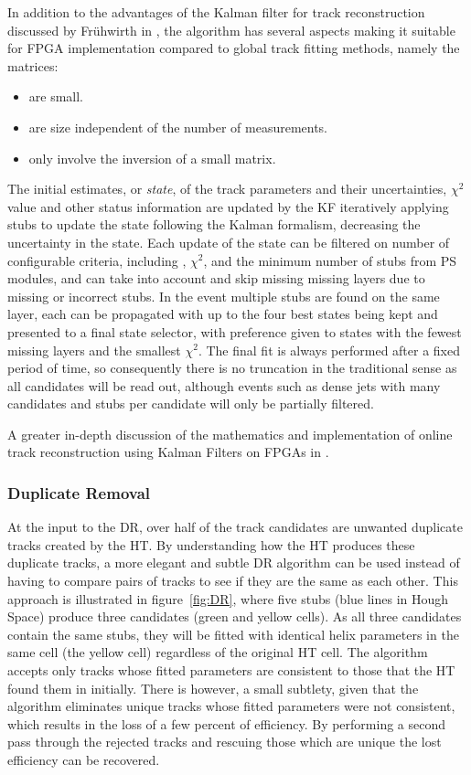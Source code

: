 In addition to the advantages of the Kalman filter for track reconstruction discussed by Fr{\"u}hwirth in \cite{Fruhwirth:1987fm}, the algorithm has several aspects making it suitable for FPGA implementation compared to global track fitting methods, namely the matrices:

\begin{itemize}
\item {are small.}
\item {are size independent of the number of measurements.}
\item {only involve the inversion of a small matrix.}
\end{itemize}

The initial estimates, or \textit{state}, of the track parameters and their uncertainties, $\chi^2$ value and other status information are updated by the KF iteratively applying stubs to update the state following the Kalman formalism, decreasing the uncertainty in the state. 
Each update of the state can be filtered on number of configurable criteria, including \pT, $\chi^2$, and the minimum number of stubs from PS modules, and can take into account and skip missing missing layers due to missing or incorrect stubs.
In the event multiple stubs are found on the same layer, each can be propagated with up to the four best states being kept and presented to a final state selector, with preference given to states with the fewest missing layers and the smallest $\chi^2$.
The final fit is always performed after a fixed period of time, so consequently there is no truncation in the traditional sense as all candidates will be read out, although events such as dense jets with many candidates and stubs per candidate will only be partially filtered.

A greater in-depth discussion of the mathematics and implementation of online track reconstruction using Kalman Filters on FPGAs in \cite{SSummers}.

\subsubsection{Duplicate Removal}
At the input to the DR, over half of the track candidates are unwanted duplicate tracks created by the HT.
By understanding how the HT produces these duplicate tracks, a more elegant and subtle DR algorithm can be used instead of having to compare pairs of tracks to see if they are the same as each other.
This approach is illustrated in figure~\ref{fig:DR}, where five stubs (blue lines in Hough Space) produce three candidates (green and yellow cells).
As all three candidates contain the same stubs, they will be fitted with identical helix parameters in the same cell (the yellow cell) regardless of the original HT cell.
The algorithm accepts only tracks whose fitted parameters are consistent to those that the HT found them in initially. There is however, a small subtlety, given that the algorithm eliminates unique tracks whose fitted parameters were not consistent, which results in the loss of a few percent of efficiency. 
By performing a second pass through the rejected tracks and rescuing those which are unique the lost efficiency can be recovered.

